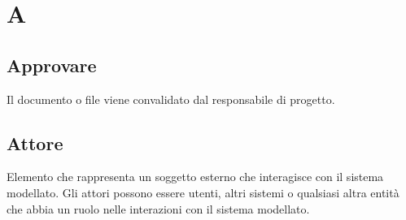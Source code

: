 \section{A}
\subsection{Approvare}%
Il documento o file viene convalidato dal responsabile di progetto.
\subsection{Attore}%
Elemento che rappresenta un soggetto esterno che interagisce con il sistema modellato. 
Gli attori possono essere utenti, altri sistemi o qualsiasi altra entità che abbia un ruolo nelle interazioni 
con il sistema modellato.
\clearpage 
